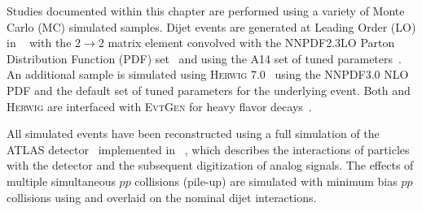 Studies documented within this chapter are performed using a variety of Monte Carlo (MC) simulated samples.
Dijet events are generated at Leading Order (LO) in ~\cite{Sjostrand:2007gs} with the $2 \rightarrow 2$ matrix element convolved with the NNPDF2.3LO Parton Distribution Function (PDF) set~\cite{Ball:2012cx} and using the A14 set of tuned parameters~\cite{ATL-PHYS-PUB-2014-021}.
An additional sample is simulated using \textsc{Herwig} 7.0~\cite{Bellm:2015jjp} using the NNPDF3.0 NLO PDF and the default set of tuned parameters for the underlying event.
Both \PYTHIA and \textsc{Herwig} are interfaced with \textsc{EvtGen} for heavy flavor decays~\cite{Lange:2001uf,ATL-PHYS-PUB-2014-008}.



All simulated events have been reconstructed using a full simulation of the ATLAS detector~\cite{SOFT-2010-01} implemented in ~\cite{Agostinelli:2002hh}, which describes the interactions of particles with the detector and the subsequent digitization of analog signals.
The effects of multiple simultaneous $pp$ collisions (pile-up) are simulated with minimum bias $pp$ collisions using  and overlaid on the nominal dijet interactions.

